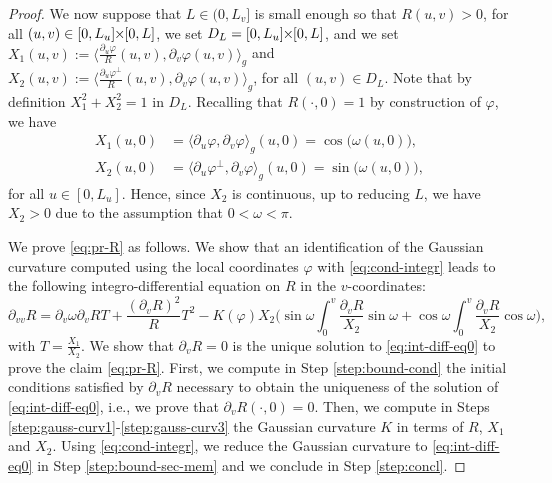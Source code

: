 \documentclass{article}
\newcommand{\DVV}{\partial_{vv}}
\newcommand{\PLH}{{\mkern-1mu\times\mkern-1mu}}
\newcommand{\Times}{\PLH}
\newcommand{\DV}{\partial_{v}}
\theoremstyle{remark}
\theoremstyle{prpart}
\newcommand{\PU}{\partial_{u}\varphi}
\newcommand{\PV}{\partial_{v}\varphi}
\newcommand{\NPU}{{\textstyle\frac{\partial_{u}\varphi}{R}}}
\begin{document}
\begin{proof}
We now suppose that $L\in (0,L_v]$ is small enough so that $R(u,v)>0$, for all $(u,v)\in[0,L_u]\Times[0, L]$, we set $D_L=[0,L_u]\Times[0,L]$, and we set $X_1(u,v) := \big\langle \NPU(u,v), \PV(u,v)\big\rangle_g$ and \sloppy $X_2(u,v) := \big\langle\frac{\PU^\perp}{R}(u,v), \PV(u,v)\big\rangle_g$, for all $(u,v)\in D_L$. Note that by definition $X_1^2+X_2^2=1$ in $D_L$. 
Recalling that $R(\cdot,0)=1$ by construction of $\varphi$, we have
\begin{subequations}\label{eq:cond-bord-X}
  \begin{align}\label{eq:cond-bord-X1}
  X_1(u,0)&=\big\langle\PU,\PV\big\rangle_g(u,0)=\cos\big(\omega(u,0)\big),\\\label{eq:cond-bord-X2}
  X_2(u,0)&=\big\langle\PU^\perp,\PV\big\rangle_g(u,0)=\sin\big(\omega(u,0)\big),
  \end{align}
  \end{subequations}
for all $u\in[0,L_u]$. Hence, since $X_2$ is continuous, up to reducing $L$, we have $X_2>0$ due to the assumption that $0<\omega<\pi$. 

We prove \eqref{eq:pr-R} as follows. We show that an identification of the Gaussian curvature computed using the local coordinates $\varphi$ with \eqref{eq:cond-integr} leads to the following integro-differential equation on $R$ in the $v$-coordinates:
\begin{equation}\label{eq:int-diff-eq0}
\DVV R =\DV\omega \DV RT  + \frac{(\DV R)^2}{R}T^2 -K(\varphi)X_2\Big(\sin\omega\int_0^v\frac{\DV R}{X_2}\sin\omega
+\cos\omega\int_0^v\frac{\DV R}{X_2}\cos\omega\Big),
\end{equation}
with $T = \displaystyle\frac{X_1}{X_2}$. We show that $\DV R=0$ is the unique solution to \eqref{eq:int-diff-eq0} to prove the claim \eqref{eq:pr-R}. First, we compute in Step \ref{step:bound-cond} the initial conditions satisfied by $\DV R$ necessary to obtain the uniqueness of the solution of \eqref{eq:int-diff-eq0}, i.e., we prove that $\DV R(\cdot,0)=0$. Then, we compute in Steps \ref{step:gauss-curv1}-\ref{step:gauss-curv3} the Gaussian curvature $K$ in terms of $R$, $X_1$ and $X_2$. Using \eqref{eq:cond-integr}, we reduce the Gaussian curvature to \eqref{eq:int-diff-eq0} in Step \ref{step:bound-sec-mem} and we conclude in Step \ref{step:concl}.


\end{proof}
\end{document}
